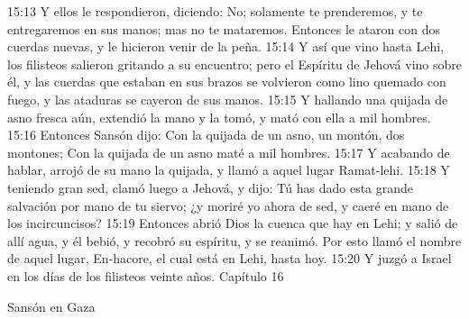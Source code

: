 15:13 Y ellos le respondieron, diciendo: No; solamente te prenderemos, y te entregaremos en sus manos; mas no te mataremos. Entonces le ataron con dos cuerdas nuevas, y le hicieron venir de la peña.  
15:14 Y así que vino hasta Lehi, los filisteos salieron gritando a su encuentro; pero el Espíritu de Jehová vino sobre él, y las cuerdas que estaban en sus brazos se volvieron como lino quemado con fuego, y las ataduras se cayeron de sus manos.  
15:15 Y hallando una quijada de asno fresca aún, extendió la mano y la tomó, y mató con ella a mil hombres.  
15:16 Entonces Sansón dijo:  
Con la quijada de un asno, un montón, dos montones;  
Con la quijada de un asno maté a mil hombres.  
15:17 Y acabando de hablar, arrojó de su mano la quijada, y llamó a aquel lugar Ramat-lehi.  
15:18 Y teniendo gran sed, clamó luego a Jehová, y dijo: Tú has dado esta grande salvación por mano de tu siervo; ¿y moriré yo ahora de sed, y caeré en mano de los incircuncisos?  
15:19 Entonces abrió Dios la cuenca que hay en Lehi; y salió de allí agua, y él bebió, y recobró su espíritu, y se reanimó. Por esto llamó el nombre de aquel lugar, En-hacore, el cual está en Lehi, hasta hoy.  
15:20 Y juzgó a Israel en los días de los filisteos veinte años.  
Capítulo 16

Sansón en Gaza  

